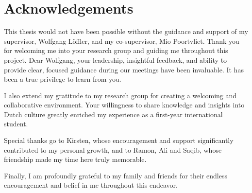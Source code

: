 \section*{Acknowledgements}
\begin{comment}
This thesis work would not have been possible without my supervisor Wolfgang Löffler and Mio Poortvliet, i want to deeply thank you for accepting me in your research group. I enjoyed every single moment i spent here.
i want to account in particular the leadership and the teachings Wolfgang Löffler, it has been a true pleasure to work and learn from you.
From the very first moments and up until the last steps, your presence has never diminished, and it resulted in being the most stable contact among these months. 
Although i always wanted to avoid disturbing your schedule too much, every time we met you have been always on point and straight to the point.
An honorable mention also to my research group, for accepting me into your work environment and sharing some valuable insights on the dutch culture that i was completely unaware of as a first year student abroad.
Finally, i can not thank enough Kirsten for contributing heavily to my personal development and Saqib for the amazing bond we developed since the beginning of your employment here.
\end{comment}

This thesis would not have been possible without the guidance and support of my supervisor,  Wolfgang Löffler, and my co-supervisor, Mio Poortvliet.
Thank you for welcoming me into your research group and guiding me throughout this project.
Dear Wolfgang, your leadership, insightful feedback, and ability to provide clear, focused guidance during our meetings have been invaluable. It has been a true privilege to learn from you.

I also extend my gratitude to my research group for creating a welcoming and collaborative environment. Your willingness to share knowledge and insights into Dutch culture greatly enriched my experience as a first-year international student. 

Special thanks go to Kirsten, whose encouragement and support significantly contributed to my personal growth, and to Ramon, Ali and Saqib, whose friendship made my time here truly memorable.

Finally, I am profoundly grateful to my family and friends for their endless encouragement and belief in me throughout this endeavor.